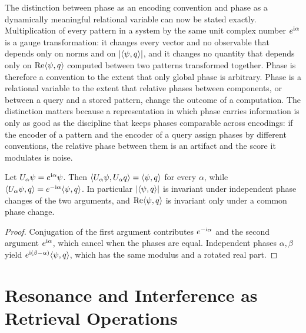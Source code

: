 The distinction between phase as an encoding convention and phase as a dynamically meaningful relational variable can now be stated exactly. Multiplication of every pattern in a system by the same unit complex number $e^{\mathrm{i}\alpha}$ is a gauge transformation: it changes every vector and no observable that depends only on norms and on $|\langle \psi,q\rangle|$, and it changes no quantity that depends only on $\operatorname{Re}\langle \psi,q\rangle$ computed between two patterns transformed together. Phase is therefore a convention to the extent that only global phase is arbitrary. Phase is a relational variable to the extent that relative phases between components, or between a query and a stored pattern, change the outcome of a computation. The distinction matters because a representation in which phase carries information is only as good as the discipline that keeps phases comparable across encodings: if the encoder of a pattern and the encoder of a query assign phases by different conventions, the relative phase between them is an artifact and the score it modulates is noise.

\begin{proposition}\label{prop:gauge}
Let $U_\alpha\psi=e^{\mathrm{i}\alpha}\psi$. Then $\langle U_\alpha\psi,U_\alpha q\rangle=\langle \psi,q\rangle$ for every $\alpha$, while $\langle U_\alpha\psi,q\rangle=e^{-\mathrm{i}\alpha}\langle \psi,q\rangle$. In particular $|\langle \psi,q\rangle|$ is invariant under independent phase changes of the two arguments, and $\operatorname{Re}\langle \psi,q\rangle$ is invariant only under a common phase change.
\end{proposition}

\begin{proof}
Conjugation of the first argument contributes $e^{-\mathrm{i}\alpha}$ and the second argument $e^{\mathrm{i}\alpha}$, which cancel when the phases are equal. Independent phases $\alpha,\beta$ yield $e^{\mathrm{i}(\beta-\alpha)}\langle \psi,q\rangle$, which has the same modulus and a rotated real part.
\end{proof}

\chapter{Resonance and Interference as Retrieval Operations}\label{ch:resonance}

